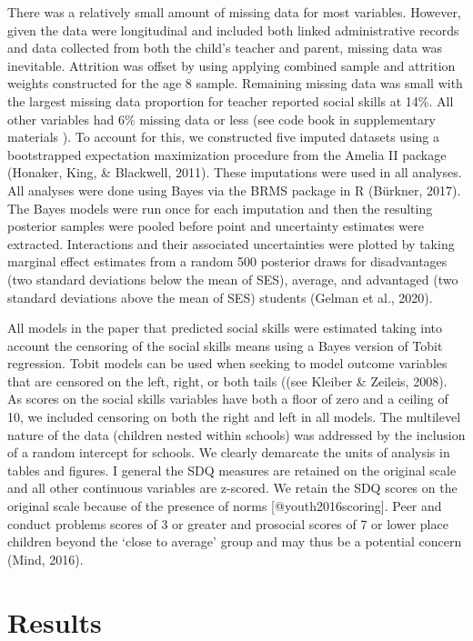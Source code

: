 \documentclass[
  english,
  man]{apa6}
\begin{document}
There was a relatively small amount of missing data for most variables. However, given the data were longitudinal and included both linked administrative records and data collected from both the child's teacher and parent, missing data was inevitable. Attrition was offset by using applying combined sample and attrition weights constructed for the age 8 sample. Remaining missing data was small with the largest missing data proportion for teacher reported social skills at 14\%. All other variables had 6\% missing data or less (see code book in supplementary materials ). To account for this, we constructed five imputed datasets using a bootstrapped expectation maximization procedure from the Amelia II package (Honaker, King, \& Blackwell, 2011). These imputations were used in all analyses. All analyses were done using Bayes via the BRMS package in R (Bürkner, 2017). The Bayes models were run once for each imputation and then the resulting posterior samples were pooled before point and uncertainty estimates were extracted. Interactions and their associated uncertainties were plotted by taking marginal effect estimates from a random 500 posterior draws for disadvantages (two standard deviations below the mean of SES), average, and advantaged (two standard deviations above the mean of SES) students (Gelman et al., 2020).

All models in the paper that predicted social skills were estimated taking into account the censoring of the social skills means using a Bayes version of Tobit regression. Tobit models can be used when seeking to model outcome variables that are censored on the left, right, or both tails ((see Kleiber \& Zeileis, 2008). As scores on the social skills variables have both a floor of zero and a ceiling of 10, we included censoring on both the right and left in all models. The multilevel nature of the data (children nested within schools) was addressed by the inclusion of a random intercept for schools. We clearly demarcate the units of analysis in tables and figures. I general the SDQ measures are retained on the original scale and all other continuous variables are z-scored. We retain the SDQ scores on the original scale because of the presence of norms {[}@youth2016scoring{]}. Peer and conduct problems scores of 3 or greater and prosocial scores of 7 or lower place children beyond the `close to average' group and may thus be a potential concern (Mind, 2016).

\hypertarget{results}{%
\section{Results}\label{results}}
\end{document}
